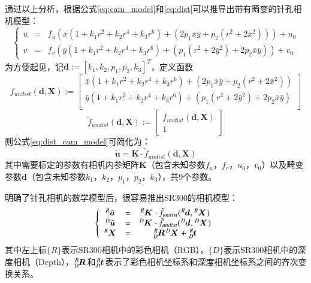 通过以上分析，根据公式\ref{eq:cam_model}和\ref{eq:dist}可以推导出带有畸变的针孔相机模型：
\begin{equation}
  \label{eq:dist_cam_model}
  \left\{
    \begin{array}{ccc}
      u&=&f_u(\bar{x}(1 + k_1r^2 + k_2r^4 + k_3r^6) + (2p_1\bar{x}\bar{y} + p_2(r^2 + 2\bar{x}^2))) + u_0\\
      v&=&f_v(\bar{y}(1 + k_1r^2 + k_2r^4 + k_3r^6) + (p_1(r^2 + 2\bar{y}^2) + 2p_2\bar{x}\bar{y})) + v_0
    \end{array}
  \right.
\end{equation}
为方便起见，记$\bm{d}:=[k_1,k_2,p_1,p_2,k_3]^T$，定义函数
\begin{equation}
  f_{undist}(\bm{d}, \bm{X}):=\left[
    \begin{array}{ccc}
      \bar{x}(1 + k_1r^2 + k_2r^4 + k_3r^6) + (2p_1\bar{x}\bar{y} + p_2(r^2 + 2\bar{x}^2))\\
      \bar{y}(1 + k_1r^2 + k_2r^4 + k_3r^6) + (p_1(r^2 + 2\bar{y}^2) + 2p_2\bar{x}\bar{y})\\
    \end{array}
  \right]
\end{equation}
\begin{equation}
  \tilde{f}_{undist}(\bm{d}, \bm{X}):=\left[
    \begin{array}{c}
      f_{undist}(\bm{d}, \bm{X})\\
      1
    \end{array}
  \right]
\end{equation}
则公式\ref{eq:dist_cam_model}可简化为：
\begin{equation}
  \tilde{\bm{u}} = \bm{K}\cdot \tilde{f}_{undist}(\bm{d}, \bm{X})
\end{equation}
其中需要标定的参数有相机内参矩阵$\bm{K}$（包含未知参数$f_u$，$f_v$，$u_0$，$v_0$）以及畸变参数$\bm{d}$（包含未知参数$k_1$，$k_2$，$p_1$，$p_2$，$k_3$），共9个参数。

明确了针孔相机的数学模型后，很容易推出SR300的相机模型：
\begin{equation}
  \label{eq:rgbd_cam_model}
  \left\{
    \begin{array}{ccc}
      \tensor*[^R]{\tilde{\bm{u}}}{}&=&\tensor*[^R]{\bm{K}}{}\cdot \tilde{f}_{undist}(\tensor*[^R]{\bm{d}}{},\tensor*[^R]{\bm{X}}{})\\
      \tensor*[^D]{\tilde{\bm{u}}}{}&=&\tensor*[^D]{\bm{K}}{}\cdot \tilde{f}_{undist}(\tensor*[^D]{\bm{d}}{},\tensor*[^D]{\bm{X}}{})\\
      \tensor*[^R]{\bm{X}}{} &=& \tensor*[^R_D]{\bm{R}}{}\tensor*[^D]{\bm{X}}{} + \tensor*[^R_D]{\bm{t}}{}
    \end{array}
  \right.
\end{equation}
其中左上标$\{R\}$表示SR300相机中的彩色相机（RGB），$\{D\}$表示SR300相机中的深度相机（Depth），$\tensor*[^R_D]{\bm{R}}{}$和$\tensor*[^R_D]{\bm{t}}{}$表示了彩色相机坐标系和深度相机坐标系之间的齐次变换关系。

